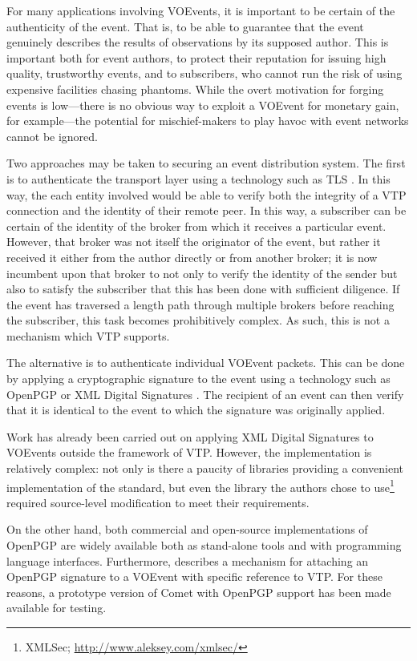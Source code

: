 \documentclass[5p,authoryear]{elsarticle}
\begin{document}
For many applications involving VOEvents, it is important to be certain of the
authenticity of the event. That is, to be able to guarantee that the event
genuinely describes the results of observations by its supposed author. This
is important both for event authors, to protect their reputation for issuing
high quality, trustworthy events, and to subscribers, who cannot run the risk
of using expensive facilities chasing phantoms. While the overt motivation for
forging events is low---there is no obvious way to exploit a VOEvent for
monetary gain, for example---the potential for mischief-makers to play havoc
with event networks cannot be ignored.

Two approaches may be taken to securing an event distribution system. The
first is to authenticate the transport layer using a technology such as TLS
\citep{Dierks:2008}. In this way, the each entity involved would be able to
verify both the integrity of a VTP connection and the identity of their remote
peer. In this way, a subscriber can be certain of the identity of the broker
from which it receives a particular event. However, that broker was not itself
the originator of the event, but rather it received it either from the author
directly or from another broker; it is now incumbent upon that broker to not
only to verify the identity of the sender but also to satisfy the subscriber
that this has been done with sufficient diligence. If the event has traversed
a length path through multiple brokers before reaching the subscriber, this
task becomes prohibitively complex. As such, this is not a mechanism which VTP
supports.

The alternative is to authenticate individual VOEvent packets. This can be
done by applying a cryptographic signature to the event using a technology
such as OpenPGP \citep{Callas:2007} or XML Digital Signatures
\citep{Bartel:2008}. The recipient of an event can then verify that it is
identical to the event to which the signature was originally applied.

Work has already been carried out on applying XML Digital Signatures to
VOEvents \citep{Allen:2008} outside the framework of VTP\@. However, the
implementation is relatively complex: not only is there a paucity of libraries
providing a convenient implementation of the standard, but even the library
the authors chose to use\footnote{XMLSec;
\url{http://www.aleksey.com/xmlsec/}} required source-level modification to
meet their requirements.

On the other hand, both commercial and open-source implementations of OpenPGP
are widely available both as stand-alone tools and with programming language
interfaces. Furthermore, \citet{Denny:2008} describes a mechanism for
attaching an OpenPGP signature to a VOEvent with specific reference to VTP\@.
For these reasons, a prototype version of Comet with OpenPGP support has been
made available for testing.
\end{document}
